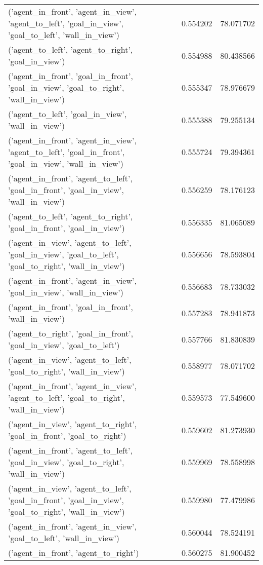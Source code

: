\begin{tabular}{lrr}
('agent\_in\_front', 'agent\_in\_view', 'agent\_to\_left', 'goal\_in\_view', 'goal\_to\_left', 'wall\_in\_view') & 0.554202 & 78.071702 \\
('agent\_to\_left', 'agent\_to\_right', 'goal\_in\_view') & 0.554988 & 80.438566 \\
('agent\_in\_front', 'goal\_in\_front', 'goal\_in\_view', 'goal\_to\_right', 'wall\_in\_view') & 0.555347 & 78.976679 \\
('agent\_to\_left', 'goal\_in\_view', 'wall\_in\_view') & 0.555388 & 79.255134 \\
('agent\_in\_front', 'agent\_in\_view', 'agent\_to\_left', 'goal\_in\_front', 'goal\_in\_view', 'wall\_in\_view') & 0.555724 & 79.394361 \\
('agent\_in\_front', 'agent\_to\_left', 'goal\_in\_front', 'goal\_in\_view', 'wall\_in\_view') & 0.556259 & 78.176123 \\
('agent\_to\_left', 'agent\_to\_right', 'goal\_in\_front', 'goal\_in\_view') & 0.556335 & 81.065089 \\
('agent\_in\_view', 'agent\_to\_left', 'goal\_in\_view', 'goal\_to\_left', 'goal\_to\_right', 'wall\_in\_view') & 0.556656 & 78.593804 \\
('agent\_in\_front', 'agent\_in\_view', 'goal\_in\_view', 'wall\_in\_view') & 0.556683 & 78.733032 \\
('agent\_in\_front', 'goal\_in\_front', 'wall\_in\_view') & 0.557283 & 78.941873 \\
('agent\_to\_right', 'goal\_in\_front', 'goal\_in\_view', 'goal\_to\_left') & 0.557766 & 81.830839 \\
('agent\_in\_view', 'agent\_to\_left', 'goal\_to\_right', 'wall\_in\_view') & 0.558977 & 78.071702 \\
('agent\_in\_front', 'agent\_in\_view', 'agent\_to\_left', 'goal\_to\_right', 'wall\_in\_view') & 0.559573 & 77.549600 \\
('agent\_in\_view', 'agent\_to\_right', 'goal\_in\_front', 'goal\_to\_right') & 0.559602 & 81.273930 \\
('agent\_in\_front', 'agent\_to\_left', 'goal\_in\_view', 'goal\_to\_right', 'wall\_in\_view') & 0.559969 & 78.558998 \\
('agent\_in\_view', 'agent\_to\_left', 'goal\_in\_front', 'goal\_in\_view', 'goal\_to\_right', 'wall\_in\_view') & 0.559980 & 77.479986 \\
('agent\_in\_front', 'agent\_in\_view', 'goal\_to\_left', 'wall\_in\_view') & 0.560044 & 78.524191 \\
('agent\_in\_front', 'agent\_to\_right') & 0.560275 & 81.900452 \\

\end{tabular}
